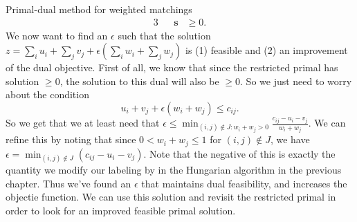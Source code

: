 \documentclass[11pt]{article}
\renewcommand{\'}{^{'}}
\begin{document}
\begin{section}{Primal-dual method for weighted matchings}
\begin{alignat}{3}
				     && \mathbf{s} & \geq 0.
	\end{alignat}
	We now want to find an $\epsilon$ such that the solution $z = \sum_i u_i + \sum_j v_j + 
	\epsilon (\sum_i w_i + \sum_j w_j)$ is (1) feasible and (2) an improvement of the dual 
	objective. First of all, we know that since the restricted primal has solution $\geq 0$, 
	the solution to this dual will also be $\geq 0$. So we just need to worry about the condition 
	\[
		u_i + v_j + \epsilon (w_i + w_j) \leq c_{ij}.
	\]
	So we get that we at least need that $\epsilon \leq \min_{(i,j)\notin J: w_i + w_j > 0}
	\frac{c_{ij} - u_i - v_j}{w_i + w_j}$. We can refine this by noting that since 
	$0 < w_i + w_j \leq 1$ for $(i,j)\notin J$, we have $\epsilon = \min_{(i,j)\notin J} 
	(c_{ij} - u_i - v_j)$. Note that the negative of this is exactly the quantity we modify our 
	labeling by in the Hungarian algorithm in the previous chapter. Thus we've found an 
	$\epsilon$ that maintains dual feasibility, and increases the objectie function. We can use 
	this solution and revisit the restricted primal in order to look for an improved feasible 
	primal solution.
\end{section}
\end{document}
